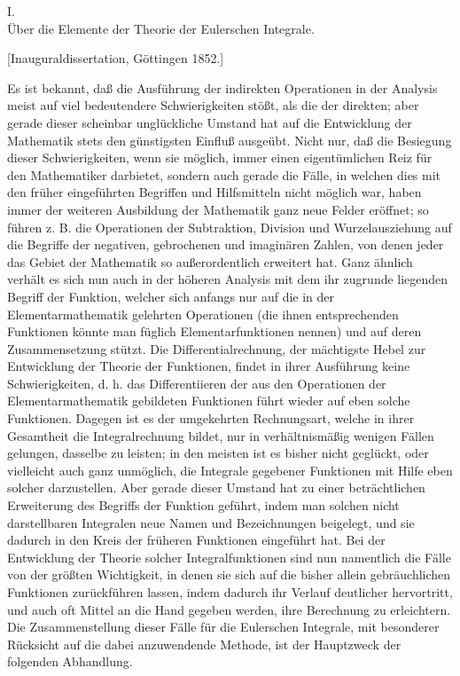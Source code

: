 \documentclass[11pt]{article}
\begin{document}
\begin{center}
{\Large I.\\[0.4em] Über die Elemente der Theorie der Eulerschen Integrale.}\par
\medskip
{\normalsize [Inauguraldissertation, Göttingen 1852.]}
\end{center}

Es ist bekannt, daß die Ausführung der indirekten Operationen in der Analysis meist auf viel bedeutendere Schwierigkeiten stößt, als die der direkten; aber gerade dieser scheinbar unglückliche Umstand hat auf die Entwicklung der Mathematik stets den günstigsten Einfluß ausgeübt. Nicht nur, daß die Besiegung dieser Schwierigkeiten, wenn sie möglich, immer einen eigentümlichen Reiz für den Mathematiker darbietet, sondern auch gerade die Fälle, in welchen dies mit den früher eingeführten Begriffen und Hilfsmitteln nicht möglich war, haben immer der weiteren Ausbildung der Mathematik ganz neue Felder eröffnet; so führen z. B. die Operationen der Subtraktion, Division und Wurzelausziehung auf die Begriffe der negativen, gebrochenen und imaginären Zahlen, von denen jeder das Gebiet der Mathematik so außerordentlich erweitert hat. Ganz ähnlich verhält es sich nun auch in der höheren Analysis mit dem ihr zugrunde liegenden Begriff der Funktion, welcher sich anfangs nur auf die in der Elementarmathematik gelehrten Operationen (die ihnen entsprechenden Funktionen könnte man füglich Elementarfunktionen nennen) und auf deren Zusammensetzung stützt. Die Differentialrechnung, der mächtigste Hebel zur Entwicklung der Theorie der Funktionen, findet in ihrer Ausführung keine Schwierigkeiten, d. h. das Differentiieren der aus den Operationen der Elementarmathematik gebildeten Funktionen führt wieder auf eben solche Funktionen. Dagegen ist es der umgekehrten Rechnungsart, welche in ihrer Gesamtheit die Integralrechnung bildet, nur in verhältnismäßig wenigen Fällen gelungen, dasselbe zu leisten; in den meisten ist es bisher nicht geglückt, oder vielleicht auch ganz unmöglich, die Integrale gegebener Funktionen mit Hilfe eben solcher darzustellen. Aber gerade dieser Umstand hat zu einer beträchtlichen Erweiterung des Begriffs der Funktion geführt, indem man solchen nicht darstellbaren Integralen neue Namen und Bezeichnungen beigelegt, und sie dadurch in den Kreis der früheren Funktionen eingeführt hat. Bei der Entwicklung der Theorie solcher Integralfunktionen sind nun namentlich die Fälle von der größten Wichtigkeit, in denen sie sich auf die bisher allein gebräuchlichen Funktionen zurückführen lassen, indem dadurch ihr Verlauf deutlicher hervortritt, und auch oft Mittel an die Hand gegeben werden, ihre Berechnung zu erleichtern. Die Zusammenstellung dieser Fälle für die Eulerschen Integrale, mit besonderer Rücksicht auf die dabei anzuwendende Methode, ist der Hauptzweck der folgenden Abhandlung.
\end{document}
